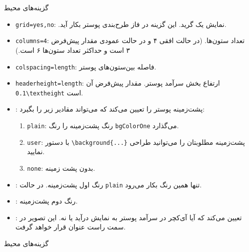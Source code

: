 \documentclass[debug,a0paper]{xebaposter}
\begin{document}
\begin{poster}
\begin{posterbox}[name=posteroption,column=1,span=2,below=classoption
,headershade=shadetb]{گزینه‌های محیط }
\begin{itemize}
    \item \texttt{grid={yes,no}}: .نمایش یک گرید. این گزینه در فاز طرح‌بندی پوستر بکار آید.
    \item \texttt{columns=4}:  تعداد ستون‌ها. 
     (در حالت افقی ۴ و در حالت عمودی مقدار پیش‌فرض ۳ است و حداکثر تعداد ستون‌ها ۶ است.)
    \item \texttt{colspacing=length}: فاصله بین‌ستون‌های پوستر.
    \item \texttt{headerheight=length}: ارتفاع بخش سرآمد پوستر. مقدار پیش‌فرض آن {\verb|0.1\textheight|} است.
    \item {}: پشت‌زمینه پوستر را تعیین می‌کند که می‌تواند مقادیر زیر را بگیرد:
    \begin{enumerate}
        \item \texttt{plain}: رنگ پشت‌زمینه را رنگ \texttt{bgColorOne} می‌گذارد.
        \item \texttt{user}: با دستور \verb|\background{...}| پشت‌زمینه مطلوبتان را می‌توانید طراحی نمایید.
        \item \texttt{none}: بدون پشت زمینه.
    \end{enumerate}
    \item {}: رنگ اول پشت‌زمینه. در حالت \texttt{plain} تنها همین رنگ بکار می‌رود.
    \item {}: رنگ دوم پشت‌زمینه.
    \item {}: تعیین می‌کند که آیا آی‌کچر در سرآمد پوستر به نمایش درآید یا نه. 
    این تصویر در سمت راست عنوان قرار خواهد گرفت.
\end{itemize}
\end{posterbox}
\begin{posterbox}[name=posterboxoption,column=1,span=2,below=posteroption,textborder=none
,headershape=rectangle,headerborder=none,textborder=coils,headershade=shadetbinverse]
{گزینه‌های محیط }

\end{posterbox}
\end{poster}
\end{document}
